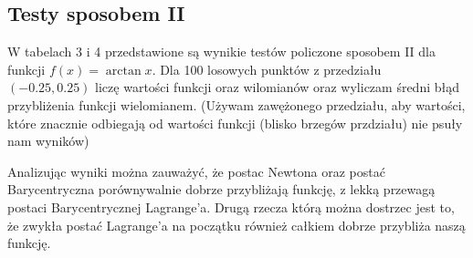 \documentclass[a4paper]{article}
\begin{document}
\subsection{Testy sposobem II}
W tabelach 3 i 4 przedstawione są wynikie testów policzone sposobem II dla funkcji 
$f(x) = \arctan{x}$. Dla 100 losowych punktów z przedziału $(-0.25, 0.25)$ liczę wartości 
funkcji oraz wilomianów oraz wyliczam średni błąd przybliżenia funkcji wielomianem. (Używam 
zawężonego przedziału, aby wartości, które znacznie odbiegają od wartości funkcji (blisko brzegów
przdziału) nie psuły nam wyników)

Analizując wyniki można zauważyć, że postac Newtona oraz postać Barycentryczna porównywalnie dobrze
przybliżają funkcję, z lekką przewagą postaci Barycentrycznej Lagrange'a. Drugą rzecza którą można
dostrzec jest to, że zwykła postać Lagrange'a na początku również całkiem dobrze przybliża naszą
funkcję.
\end{document}
